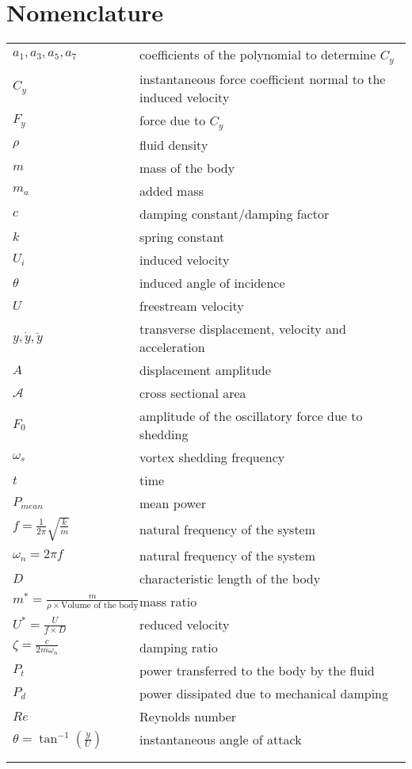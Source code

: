 \section*{Nomenclature}



\begin{tabular}{ll}
$a_1,a_3,a_5,a_7$ & coefficients of the polynomial to determine $C_y$ \\ 
$C_y$ & instantaneous force coefficient normal to the induced velocity \\
$F_y$ & force due to $C_y$  \\ 
$\rho$ & fluid density  \\
$m$ & mass of the body \\
$m_a$ & added mass \\
$c$ & damping constant/damping factor \\
$k$ & spring constant \\
$U_i$ & induced velocity \\
$\theta$ & induced angle of incidence \\
$U$ & freestream velocity \\
$y,\dot{y},\ddot{y}$ & transverse displacement, velocity and acceleration   \\
$A$ & displacement amplitude\\
$\mathcal{A}$ & cross sectional area\\ 
$F_0$& amplitude of the oscillatory force due to shedding \\
$\omega_s$& vortex shedding frequency \\
$t$ & time \\
$P_{mean}$& mean power \\
$f=\frac{1}{2\pi}\sqrt{\frac{k}{m}}$& natural frequency of the system \\
$\omega_n= 2 \pi f$& natural frequency of the system  \\
$D$ & characteristic length of the body  \\
$m^*=\frac{m}{\rho \times \text{Volume of the body}}$& mass ratio \\
$U^*=\frac{U}{f \times D}$& reduced velocity  \\
$\zeta= \frac{c}{2 m \omega_n}$& damping ratio \\
$P_t$   & power transferred to the body by the fluid \\
$P_d$& power dissipated due to mechanical damping  \\
$Re$& Reynolds number  \\
$\theta= \tan^{-1}{(\frac{\dot{y}}{U})}$& instantaneous angle of attack\\
& \\
& \\
\end{tabular}  